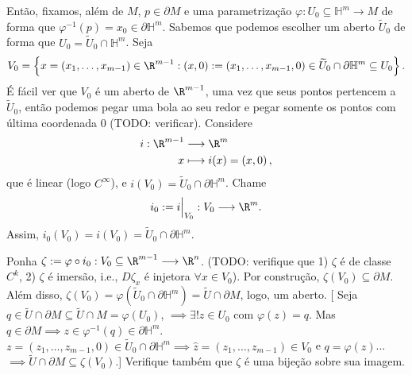 Então, fixamos, além de $M$, $p \in \partial M$ e uma parametrização $\varphi : U_0\subseteq\mathbb{H}^{m} \longrightarrow M$ de forma que $\varphi ^{-1}\left( p \right) = x_0 \in \partial \mathbb{H}^{m}$. Sabemos que podemos escolher um aberto $\widetilde{U}_0$ de forma que $U_0 = \widetilde{U}_0 \cap \mathbb{H}^{m}$. Seja \[
V_0 = \left\{ x = \left( x_1,\ldots,x_{m-1} \right) \in \R^{m-1} : \left( x, 0 \right) := \left( x_1,\ldots,x_{m-1},0 \right) \in \widetilde{U}_0 \cap \partial \mathbb{H}^{m}  \subseteq U_0 \right\} 
.\] É fácil ver que $V_0$ é um aberto de $\R^{m-1}$, uma vez que seus pontos pertencem a $\widetilde{U}_0$, então podemos pegar uma bola ao seu redor e pegar somente os pontos com última coordenada 0 (TODO: verificar). Considere
\begin{align*}
    i:\R^{m-1}  &\longrightarrow \R^{m} \\
    x &\longmapsto i(x) = \left( x,0 \right)  
,\end{align*}
que é linear (logo $C^{\infty}$), e $i\left( V_0 \right) = \widetilde{U}_0 \cap \partial \mathbb{H}^{m}$. Chame \[
i_0:= i\Big|_{V_0}: V_0 \longrightarrow \R^{m}
.\] Assim, $i_0\left( V_0 \right) = i\left( V_0 \right) = \widetilde{U}_0 \cap \partial \mathbb{H}^{m}$.

Ponha $\zeta :=\varphi \circ i_0 : V_0\subseteq\R^{m-1} \longrightarrow \R^{n}$. (TODO: verifique que 1) $\zeta$ é de classe $C^{k}$, 2) $\zeta $ é imersão, i.e., $D\zeta_x$ é injetora $\forall x\in V_0$). Por construção, $\zeta \left( V_0 \right) \subseteq \partial M$. Além disso, $\zeta \left( V_0 \right) = \varphi \left( \widetilde{U}_0 \cap \partial \mathbb{H}^{m} \right) = \widetilde{U} \cap \partial M$, logo, um aberto. 
[ Seja $q\in \widetilde{U} \cap \partial M \subseteq \widetilde{U} \cap M = \varphi \left( U_0 \right) $, $\implies \exists ! z\in U_0$ com $\varphi \left( z \right) =q$. Mas $q\in \partial M \implies z\in \varphi ^{-1}\left( q \right) \in \partial \mathbb{H}^{m}$. $z=\left( z_1,\ldots,z_{m-1},0 \right) \in \widetilde{U}_0 \cap \partial \mathbb{H}^{m} \implies \hat{z} = \left( z_1,\ldots,z_{m-1} \right) \in V_0 $ e $q = \varphi \left( z \right) $... $\implies \widetilde{U}\cap \partial M \subseteq \zeta\left( V_0 \right) $.]  Verifique também que $\zeta$ é uma bijeção sobre sua imagem.

